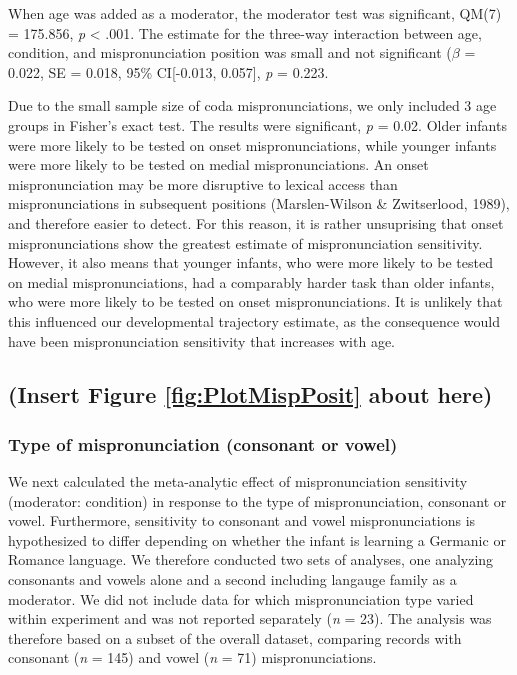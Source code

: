 \documentclass[man]{apa6}
\begin{document}
When age was added as a moderator, the moderator test was significant, QM(7) = 175.856, \emph{p} \textless{} .001. The estimate for the three-way interaction between age, condition, and mispronunciation position was small and not significant (\(\beta\) = 0.022, SE = 0.018, 95\% CI{[}-0.013, 0.057{]}, \emph{p} = 0.223.

Due to the small sample size of coda mispronunciations, we only included 3 age groups in Fisher's exact test. The results were significant, \emph{p} = 0.02. Older infants were more likely to be tested on onset mispronunciations, while younger infants were more likely to be tested on medial mispronunciations. An onset mispronunciation may be more disruptive to lexical access than mispronunciations in subsequent positions (Marslen-Wilson \& Zwitserlood, 1989), and therefore easier to detect. For this reason, it is rather unsuprising that onset mispronunciations show the greatest estimate of mispronunciation sensitivity. However, it also means that younger infants, who were more likely to be tested on medial mispronunciations, had a comparably harder task than older infants, who were more likely to be tested on onset mispronunciations. It is unlikely that this influenced our developmental trajectory estimate, as the consequence would have been mispronunciation sensitivity that increases with age.

\hypertarget{insert-figure-reffigplotmispposit-about-here}{%
\subsection{(Insert Figure \ref{fig:PlotMispPosit} about here)}\label{insert-figure-reffigplotmispposit-about-here}}

\hypertarget{type-of-mispronunciation-consonant-or-vowel}{%
\subsubsection{Type of mispronunciation (consonant or vowel)}\label{type-of-mispronunciation-consonant-or-vowel}}

We next calculated the meta-analytic effect of mispronunciation sensitivity (moderator: condition) in response to the type of mispronunciation, consonant or vowel. Furthermore, sensitivity to consonant and vowel mispronunciations is hypothesized to differ depending on whether the infant is learning a Germanic or Romance language. We therefore conducted two sets of analyses, one analyzing consonants and vowels alone and a second including langauge family as a moderator. We did not include data for which mispronunciation type varied within experiment and was not reported separately (\emph{n} = 23). The analysis was therefore based on a subset of the overall dataset, comparing records with consonant (\emph{n} = 145) and vowel (\emph{n} = 71) mispronunciations.
\end{document}

